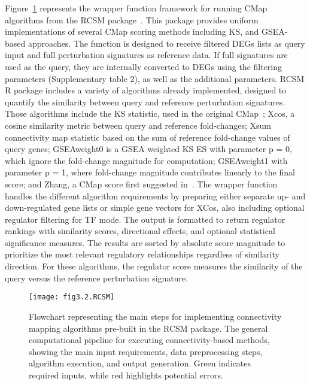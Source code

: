 Figure~\ref{fig:fig3.2.RCSM} represents the wrapper function framework for running \gls{CMap} algorithms from the \gls{RCSM} package~\cite{RN79}. 
This package provides uniform implementations of several \gls{CMap} scoring methods including \gls{KS}, and \gls{GSEA}-based approaches. 
The function is designed to receive filtered \gls{DEGs} lists as query input and full perturbation signatures as reference data. 
If full signatures are used as the query, they are internally converted to \gls{DEGs} using the filtering parameters (Supplementary table 2), as well as the additional parameters. \gls{RCSM} \gls{R} package includes a variety of algorithms already implemented, designed to quantify the similarity between query and reference perturbation signatures. 
Those algorithms include the \gls{KS} statistic, used in the original \gls{CMap}~\cite{RN34}; Xcos, a cosine similarity metric between query and reference fold-changes; Xsum connectivity map statistic based on the sum of reference fold-change values of query genes; GSEAweight0 is a \gls{GSEA} weighted KS ES with parameter p = 0, which ignore the fold-change magnitude for computation; GSEAweight1 with parameter p = 1, where fold-change magnitude contributes linearly to the final score; and Zhang, a \gls{CMap} score first suggested in~\cite{RN161}. 
The wrapper function handles the different algorithm requirements by preparing either separate up- and down-regulated gene lists or simple gene vectors for XCos, also including optional regulator filtering for \gls{TF} mode. 
The output is formatted to return regulator rankings with similarity scores, directional effects, and optional statistical significance measures. 
The results are sorted by absolute score magnitude to prioritize the most relevant regulatory relationships regardless of similarity direction. 
For these algorithms, the regulator score measures the similarity of the query versus the reference perturbation signature.


\begin{figure}[htbp]
    \centering
    \texttt{[image: fig3.2.RCSM]}
    \caption[Flowchart representing the main steps for implementing connectivity mapping algorithms pre-built in the RCSM package.]{Flowchart representing the main steps for implementing connectivity mapping algorithms pre-built in the RCSM package. The general computational pipeline for executing connectivity-based methods, showing the main input requirements, data preprocessing steps, algorithm execution, and output generation. Green indicates required inputs, while red highlights potential errors.}
    \label{fig:fig3.2.RCSM}
\end{figure}


